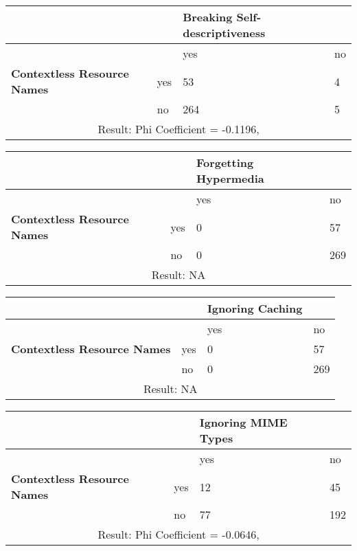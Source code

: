 \documentclass[a4paper,12pt]{article}
\begin{document}
\begin{center}
  \begin{tabular}{| p{60mm} | p{10mm} | p{35mm} | p{35mm} |}
  \hline
   & & \textbf{Breaking Self-descriptiveness} &
  \\
  \hline
  & & yes & no
  \\
  \hline
  \textbf{Contextless Resource Names} & yes & 53 & 4
  \\
  \hline
   & no & 264 & 5
  \\
  \hline
  \multicolumn{4}{|c|}{Result: Phi Coefficient = -0.1196, }
  \\ \hline
  \end{tabular}
  \end{center}

\begin{center}
  \begin{tabular}{| p{60mm} | p{10mm} | p{35mm} | p{35mm} |}
  \hline
   & & \textbf{Forgetting Hypermedia} &
  \\
  \hline
  & & yes & no
  \\
  \hline
  \textbf{Contextless Resource Names} & yes & 0 & 57
  \\
  \hline
   & no & 0 & 269
  \\
  \hline
  \multicolumn{4}{|c|}{Result: NA}
  \\ \hline
  \end{tabular}
  \end{center}

\begin{center}
  \begin{tabular}{| p{60mm} | p{10mm} | p{35mm} | p{35mm} |}
  \hline
   & & \textbf{Ignoring Caching} &
  \\
  \hline
  & & yes & no
  \\
  \hline
  \textbf{Contextless Resource Names} & yes & 0 & 57
  \\
  \hline
   & no & 0 & 269
  \\
  \hline
  \multicolumn{4}{|c|}{Result: NA}
  \\ \hline
  \end{tabular}
  \end{center}

\begin{center}
  \begin{tabular}{| p{60mm} | p{10mm} | p{35mm} | p{35mm} |}
  \hline
   & & \textbf{Ignoring MIME Types} &
  \\
  \hline
  & & yes & no
  \\
  \hline
  \textbf{Contextless Resource Names} & yes & 12 & 45
  \\
  \hline
   & no & 77 & 192
  \\
  \hline
  \multicolumn{4}{|c|}{Result: Phi Coefficient = -0.0646, }
  \\ \hline
  \end{tabular}
  \end{center}
\end{document}
